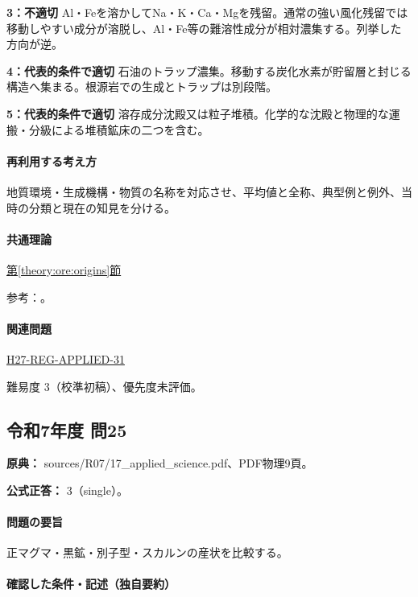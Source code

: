 \noindent\textbf{3：不適切} Al・Feを溶かしてNa・K・Ca・Mgを残留。通常の強い風化残留では移動しやすい成分が溶脱し、Al・Fe等の難溶性成分が相対濃集する。列挙した方向が逆。\par

\noindent\textbf{4：代表的条件で適切} 石油のトラップ濃集。移動する炭化水素が貯留層と封じる構造へ集まる。根源岩での生成とトラップは別段階。\par

\noindent\textbf{5：代表的条件で適切} 溶存成分沈殿又は粒子堆積。化学的な沈殿と物理的な運搬・分級による堆積鉱床の二つを含む。\par

\paragraph{再利用する考え方} 地質環境・生成機構・物質の名称を対応させ、平均値と全称、典型例と例外、当時の分類と現在の知見を分ける。

\paragraph{共通理論} \hyperref[theory:ore:origins]{第\ref*{theory:ore:origins}節}

\par 参考：\cite{ore50_bauxite_ref,ore50_porphyry_ref,ore50_magmatic_ref,ore50_besshi_ref}。

\paragraph{関連問題} \hyperref[q:h27-reg-applied-31]{H27-REG-APPLIED-31}

\par 難易度 3（校準初稿）、優先度未評価。

\subsection{令和7年度 問25}
\label{q:r07-reg-applied-25}

\noindent\textbf{原典：} sources/R07/17\_applied\_science.pdf、PDF物理9頁。

\textbf{公式正答：} 3（single）。

\paragraph{問題の要旨} 正マグマ・黒鉱・別子型・スカルンの産状を比較する。

\paragraph{確認した条件・記述（独自要約）}\mbox{}\par

